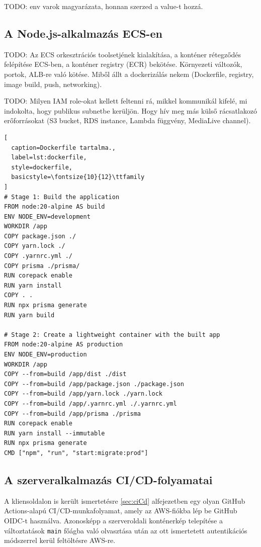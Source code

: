 TODO: env varok magyarázata, honnan szerzed a value-t hozzá.

\subsection{A Node.js-alkalmazás ECS-en}

TODO: Az ECS orkesztrációs toolsetjének kialakítása, a konténer rétegződés felépítése ECS-ben, a konténer registry (ECR) bekötése. Környezeti változók, portok, ALB-re való kötése. Miből állt a dockerizálás nekem (Dockerfile, registry, image build, push, networking).

TODO: Milyen IAM role-okat kellett feltenni rá, mikkel kommunikál kifelé, mi indokolta, hogy publikus subnetbe kerüljön. Hogy hív meg más külső rácsatlakozó erőforrásokat (S3 bucket, RDS instance, Lambda függvény, MediaLive channel).

\begin{minipage}{0.92\textwidth}
  \begin{lstlisting}[
  caption=Dockerfile tartalma.,
  label=lst:dockerfile,
  style=dockerfile,
  basicstyle=\fontsize{10}{12}\ttfamily
]
# Stage 1: Build the application
FROM node:20-alpine AS build
ENV NODE_ENV=development
WORKDIR /app
COPY package.json ./
COPY yarn.lock ./
COPY .yarnrc.yml ./
COPY prisma ./prisma/
RUN corepack enable
RUN yarn install
COPY . .
RUN npx prisma generate
RUN yarn build

# Stage 2: Create a lightweight container with the built app
FROM node:20-alpine AS production
ENV NODE_ENV=production
WORKDIR /app
COPY --from=build /app/dist ./dist
COPY --from=build /app/package.json ./package.json
COPY --from=build /app/yarn.lock ./yarn.lock
COPY --from=build /app/.yarnrc.yml ./.yarnrc.yml
COPY --from=build /app/prisma ./prisma
RUN corepack enable
RUN yarn install --immutable
RUN npx prisma generate
CMD ["npm", "run", "start:migrate:prod"]
\end{lstlisting}
\end{minipage}

\subsection{A szerveralkalmazás CI/CD-folyamatai}

A kliensoldalon is került ismertetésre \ref{sec:ciCd} alfejezetben egy olyan GitHub Actions-alapú CI/CD-munkafolyamat, amely az AWS-fiókba lép be GitHub OIDC-t használva. Azonosképp a szerveroldali konténerkép telepítése a változtatások \verb|main| főágba való olvasztása után az ott ismertetett autentikációs módszerrel kerül feltöltésre AWS-re.

